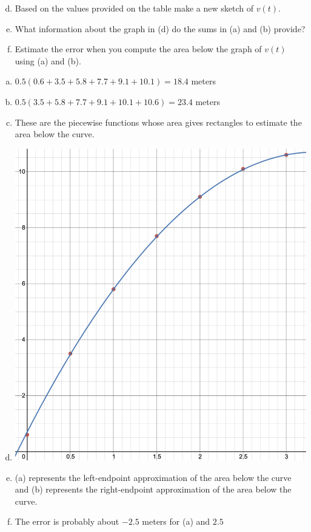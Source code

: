 \documentclass[11pt]{exam}
\begin{document}
\begin{questions}
\begin{enumerate}[(a)]
\setcounter{enumi}{3}
	\item Based on the values provided on the table make a new sketch of $v(t)$.
	\item What information about the graph in (d) do the sums in (a) and (b) provide?
	\item Estimate the error when you compute the area below the graph of $v(t)$ using (a) and (b).
\end{enumerate}
\begin{solution}
  \begin{enumerate}[(a)]
  \item \(0.5(0.6+3.5+5.8+7.7+9.1+10.1) = 18.4\) meters
  \item \(0.5(3.5+5.8+7.7+9.1+10.1+10.6) = 23.4\) meters
  \item These are the piecewise functions whose area gives rectangles
    to estimate the area below the curve.
  \item \includegraphics[scale=0.5]{Figures/1d}
  \item (a) represents the left-endpoint approximation of the area
    below the curve and (b)
    represents the right-endpoint approximation of the area below the curve.
  \item The error is probably about \(-2.5\) meters for (a) and \(2.5\)

\end{enumerate}
\end{solution}
\end{questions}
\end{document}
